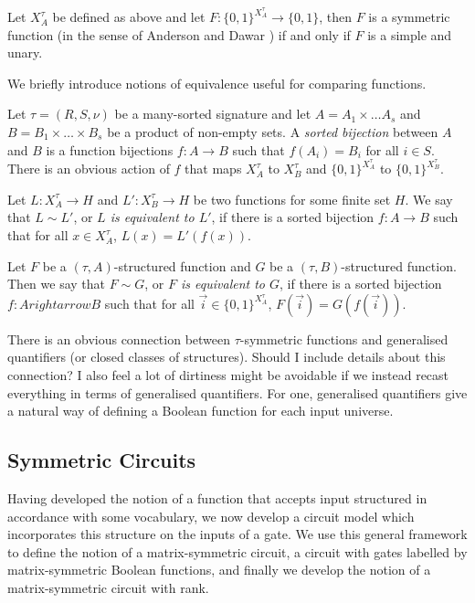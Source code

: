 \documentclass[../paper.tex]{subfiles}
\begin{document}
\begin{lem}
  Let $X^\tau_A$ be defined as above and let $F: \{0,1\}^{X^{\tau}_A}
  \rightarrow \{0,1\}$, then $F$ is a symmetric function (in the sense of
  Anderson and Dawar \cite{AndersonD17}) if and only if $F$ is a simple and
  unary.
\end{lem}

We briefly introduce notions of equivalence useful for comparing functions.
\begin{definition}
  Let $\tau = (R, S, \nu)$ be a many-sorted signature and let $A = A_1 \times
  \ldots A_s$ and $B = B_1 \times \ldots \times B_s$ be a product of non-empty
  sets. A \emph{sorted bijection} between $A$ and $B$ is a function bijections
  $f: A \rightarrow B$ such that $f (A_i) = B_i$ for all $i \in S$. There is an
  obvious action of $f$ that maps $X^\tau_A$ to $X^\tau_B$ and
  $\{0,1\}^{X^\tau_A}$ to $\{0,1\}^{X^\tau_B}$.

  Let $L: X^\tau_A \rightarrow H$ and $L': X^\tau_B \rightarrow H$ be two
  functions for some finite set $H$. We say that $L \sim L'$, or \emph{$L$ is
    equivalent to $L'$}, if there is a sorted bijection $f: A \rightarrow B$
  such that for all $x \in X^\tau_A$, $L(x) = L'(f (x))$.

  Let $F$ be a $(\tau, A)$-structured function and $G$ be a $(\tau,
  B)$-structured function. Then we say that $F \sim G$, or \emph{$F$ is
    equivalent to $G$}, if there is a sorted bijection $f: A rightarrow B$ such
  that for all $\vec{i} \in \{0,1\}^{X^\tau_A}$, $F (\vec{i}) = G(f(\vec{i}))$.
\end{definition}

\begin{remark}
  There is an obvious connection between $\tau$-symmetric functions and
  generalised quantifiers (or closed classes of structures). Should I include
  details about this connection? I also feel a lot of dirtiness might be
  avoidable if we instead recast everything in terms of generalised quantifiers.
  For one, generalised quantifiers give a natural way of defining a Boolean
  function for each input universe.
\end{remark}

\subsection{Symmetric Circuits}
Having developed the notion of a function that accepts input structured in
accordance with some vocabulary, we now develop a circuit model which
incorporates this structure on the inputs of a gate. We use this general
framework to define the notion of a matrix-symmetric circuit, a circuit with
gates labelled by matrix-symmetric Boolean functions, and finally we develop the
notion of a matrix-symmetric circuit with rank.
\end{document}
